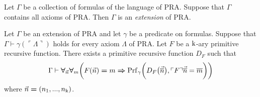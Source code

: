 \documentclass[10pt]{amsart}
\newcommand{\godel}[1]{\ulcorner #1 \urcorner}
\newcommand{\mforall}{\boldsymbol{\forall}}
\newcommand{\mra}{\boldsymbol{\Rightarrow}}
\newcommand{\meq}{\boldsymbol{=}}
\begin{document}
\begin{definition}
  Let $\Gamma$ be a collection of formulas of the language of $\mathrm{PRA}$. Suppose that $\Gamma$ contains all axioms of $\mathrm{PRA}$. Then $\Gamma$ is an \textit{extension} of $\mathrm{PRA}$.
\end{definition}

\begin{theorem}\label{theorem:representability_of_primitive_recursive_equations}
  Let $\Gamma$ be an extension of $\mathrm{PRA}$ and let $\gamma$ be a predicate on formulas. Suppose that $\Gamma \vdash \gamma(\godel{\Lambda})$ holds for every axiom $\Lambda$ of $\mathrm{PRA}$. Let $F$ be a $\rm{k}$-ary primitive recursive function. There exists a primitive recursive function $D_F$ such that
  $$\Gamma \vdash \mforall_{\vec{n}}\mforall_m\bigg(F(\vec{n}) \meq m \mra \mathrm{Prf}_{\gamma}\bigg(D_F\big(\vec{\ol{n}}\big), \godel{F}\vec{\ol{n}} = \ol{m}\bigg)\bigg)$$
	where $\vec{n} \meq \left(n_{\rm{1}},...,n_{\rm{k}}\right)$.
\end{theorem}
\end{document}
